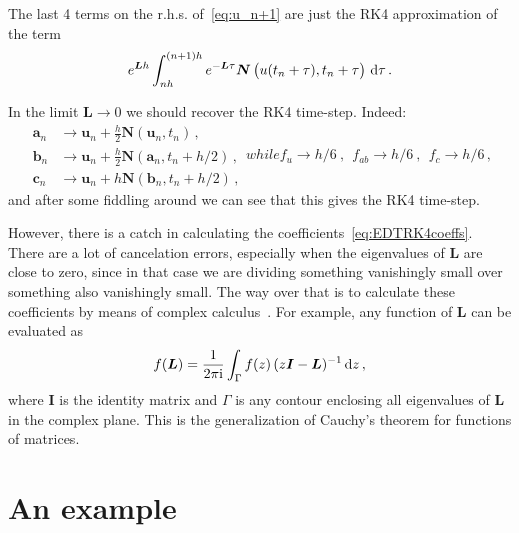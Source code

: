\documentclass[11pt]{article}
\def\beq{\begin{equation}}
\def\eeq{\end{equation}}
\newcommand{\bu}{\boldsymbol{u}}
\newcommand{\ba}{\boldsymbol{a}}
\newcommand{\bb}{\boldsymbol{b}}
\newcommand{\bc}{\boldsymbol{c}}
\newcommand{\bL}{\ensuremath {\boldsymbol {L}}}
\newcommand{\bI}{\ensuremath {\boldsymbol {I}}}
\newcommand{\bN}{\ensuremath {\boldsymbol {N}}}
\def\ii{{\rm i}}
\def\dd{{\rm d}}
\newcommand{\com}{\, ,}
\newcommand{\per}{\, .}
\renewcommand{\(}{\left(}
\renewcommand{\[}{\left[}
\renewcommand{\)}{\right)}
\renewcommand{\]}{\right]}
\newcommand{\<}{\left\langle}
\renewcommand{\>}{\right\rangle}
\begin{document}
The last 4 terms on the r.h.s. of~\eqref{eq:u_n+1} are just the RK4 approximation of the term
\beq
e^{\bL h} \int_{nh}^{(n+1)h} e^{-\bL \tau} \bN\(\vphantom{\dot{W}} u(t_n+\tau),t_n+\tau\)\,\dd\tau\per
\eeq


In the limit $\bL\to0$ we should recover the RK4 time-step. Indeed:\begin{subequations}
\begin{align}
\ba_n&\to \bu_n + \frac{h}{2} \bN(\bu_n,t_n)\com\\
\bb_n&\to \bu_n + \frac{h}{2} \bN(\ba_n,t_n+h/2)\com\\
\bc_n&\to \bu_n + h \bN(\bb_n,t_n+h/2)\com
\end{align}
while
\beq
f_u\to h/6~,~~f_{ab}\to h/6~,~~f_c\to h/6\com
\eeq\end{subequations}
and after some fiddling around we can see that this gives the RK4 time-step.

\vspace{1em}

%

However, there is a catch in calculating the coefficients~\eqref{eq:EDTRK4coeffs}. There are a lot of cancelation errors, especially when the eigenvalues of $\bL$ are close to zero, since in that case we are dividing something vanishingly small over something also vanishingly small. The way over that is to calculate these coefficients by means of complex calculus~\citep{Kassam-Trefethen-2005}. For example, any function of $\bL$ can be evaluated as
\beq
f(\bL) =\frac1{2\pi \ii} \int_{\Gamma} f(z)\,(z\bI-\bL)^{-1}\,\dd z\com
\eeq
where $\bI$ is the identity matrix and $\Gamma$ is any contour enclosing all eigenvalues of $\bL$ in the complex plane. This is the generalization of Cauchy's theorem for functions of matrices.


\section{An example}
\end{document}
